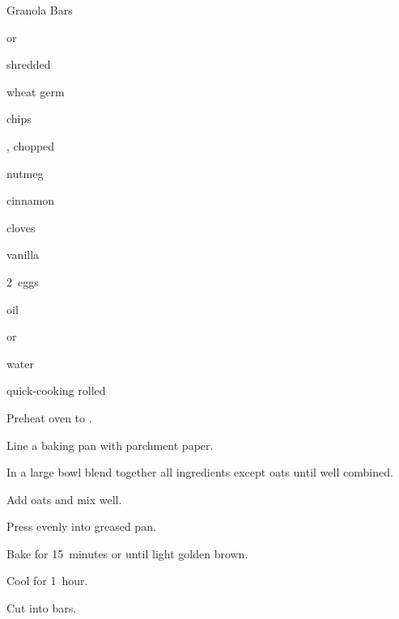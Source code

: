 \begin{recipe}{Granola Bars}{}{}

\begin{ingredients}
\item \C{\half}  or 
\item \C{\half} shredded 
\item \C{\quarter} wheat germ
\item \C{\quarter}  chips
\item \C{\quarter} , chopped
\item \tp{\half} nutmeg 
\item \tp{\half} cinnamon 
\item \tp{\half} cloves 
\item \tp{\half}  
\item {} vanilla 
\item 2~eggs
\item \C{\twothird} 
\item {} oil
\item {}  or 
\item \C{\half} water
\item {} quick-cooking rolled 
\end{ingredients}

\begin{directions}
\item Preheat oven to . 
\item Line a  baking pan with parchment paper.
\item In a large bowl blend together all ingredients except oats until well combined.
\item Add oats and mix well.
\item Press evenly into greased pan.
\item Bake for 15~minutes or until light golden brown.
\item Cool for 1~hour. 
\item Cut into bars. 
\end{directions}

\end{recipe}

